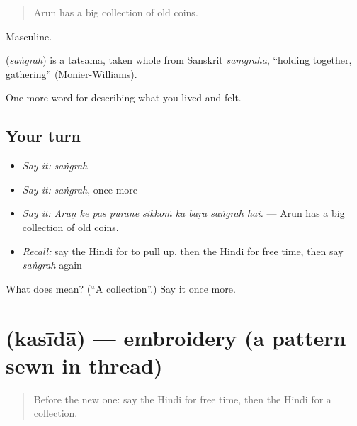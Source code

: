 \begin{quote}
Arun has a big collection of old coins.
\end{quote}

Masculine.

\begin{cousinweb}
\textbf{} (\emph{saṅgrah}) is a tatsama, taken whole from Sanskrit \emph{saṃgraha}, \textquotedblleft{}holding together, gathering\textquotedblright{} (Monier-Williams).
\end{cousinweb}

\begin{grammarlens}[title={What you've built}]
One more word for describing what you lived and felt.
\end{grammarlens}

\subsection*{Your turn}
\begin{itemize}
\raggedright
  \item \emph{Say it:} \emph{saṅgrah}
  \item \emph{Say it:} \emph{saṅgrah}, once more
  \item \emph{Say it:} \emph{Aruṇ ke pās purāne sikkoṁ kā baṛā saṅgrah hai.} — Arun has a big collection of old coins.
  \item \emph{Recall:} say the Hindi for to pull up, then the Hindi for free time, then say \emph{saṅgrah} again
\end{itemize}

\begin{tcolorbox}[breakable,colback=teal!4,colframe=teal!35!black,title={Before you move on}]
What does  mean? (\textquotedblleft{}A collection\textquotedblright{}.) Say it once more.
\end{tcolorbox}
\section[\texorpdfstring{\hi{कसीदा} (kasīdā)}{कसीदा (kasīdā)}]{ (kasīdā) — embroidery (a pattern sewn in thread)}

\label{lesson:HI-C526-kasida}



\begin{quote}
Before the new one: say the Hindi for free time, then the Hindi for a collection.
\end{quote}

